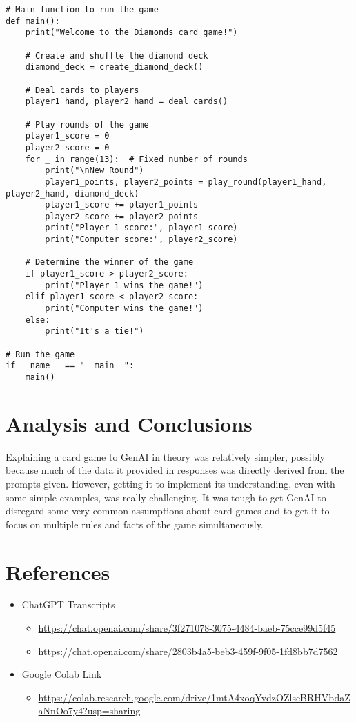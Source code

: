 \documentclass[10pt,onecolumn,letterpaper]{article}
\begin{document}
\begin{lstlisting}
# Main function to run the game
def main():
    print("Welcome to the Diamonds card game!")

    # Create and shuffle the diamond deck
    diamond_deck = create_diamond_deck()

    # Deal cards to players
    player1_hand, player2_hand = deal_cards()

    # Play rounds of the game
    player1_score = 0
    player2_score = 0
    for _ in range(13):  # Fixed number of rounds
        print("\nNew Round")
        player1_points, player2_points = play_round(player1_hand, player2_hand, diamond_deck)
        player1_score += player1_points
        player2_score += player2_points
        print("Player 1 score:", player1_score)
        print("Computer score:", player2_score)

    # Determine the winner of the game
    if player1_score > player2_score:
        print("Player 1 wins the game!")
    elif player1_score < player2_score:
        print("Computer wins the game!")
    else:
        print("It's a tie!")

# Run the game
if __name__ == "__main__":
    main()
\end{lstlisting}

\section*{Analysis and Conclusions}
Explaining a card game to GenAI in theory was relatively simpler, possibly because much of the data it provided in responses was directly derived from the prompts given. However, getting it to implement its understanding, even with some simple examples, was really challenging. It was tough to get GenAI to disregard some very common assumptions about card games and to get it to focus on multiple rules and facts of the game simultaneously.

\section*{References}
\begin{itemize}
  \item ChatGPT Transcripts
  \begin{itemize}
    \item \url{https://chat.openai.com/share/3f271078-3075-4484-baeb-75cce99d5f45}
    \item \url{https://chat.openai.com/share/2803b4a5-beb3-459f-9f05-1fd8bb7d7562}
  \end{itemize}
  
  \item Google Colab Link
  \begin{itemize}
    \item \url{https://colab.research.google.com/drive/1mtA4xoqYvdzOZlseBRHVbdaZaNnOo7y4?usp=sharing}
  \end{itemize}
\end{itemize}
\end{document}
